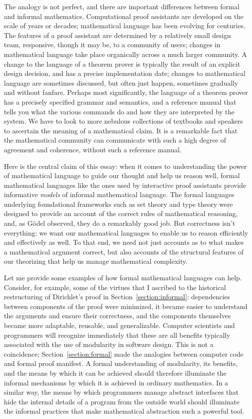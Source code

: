 \documentclass[11pt]{article}
\begin{document}
The analogy is not perfect, and there are important differences between formal and informal mathematics. Computational proof assistants are developed on the scale of years or decades; mathematical language has been evolving for centuries. The features of a proof assistant are determined by a relatively small design team, responsive, though it may be, to a community of users; changes in mathematical language take place organically across a much larger community. A change to the language of a theorem prover is typically the result of an explicit design decision, and has a precise implementation date; changes to mathematical language are sometimes discussed, but often just happen, sometimes gradually and without fanfare. Perhaps most significantly, the language of a theorem prover has a precisely specified grammar and semantics, and a reference manual that tells you what the various commands do and how they are interpreted by the system. We have to look to more nebulous collections of textbooks and speakers to ascertain the meaning of a mathematical claim. It is a remarkable fact that the mathematical community can communicate with such a high degree of agreement and coherence, without such a reference manual.

Here is the central claim of this essay: when it comes to understanding the power of mathematical language to guide our thought and help us reason well, formal mathematical languages like the ones used by interactive proof assistants provide informative \emph{models} of informal mathematical language. The formal languages underlying foundational frameworks such as set theory and type theory were designed to provide an account of the correct rules of mathematical reasoning, and, as G\"odel observed, they do a remarkably good job. But correctness isn't everything: we want our mathematical languages to enable us to reason efficiently and effectively as well. To that end, we need not just accounts as to what makes a mathematical argument correct, but also accounts of the structural features of our theorizing that help us manage mathematical complexity.

Let me provide some examples of how formal mathematical languages can help. Consider, for example, some of the virtues that I ascribed to the historical restructuring of Dirichlet's proof in Section~\ref{section:informal}: dependencies between components of the proof were minimized, it became easier to understand the arguments and ensure their correctness, and the components themselves became more adaptable, reusable, and generalizable. Computer scientists and programmers will recognize immediately that these are all benefits typically associated with the use of modularity in software design. This is not a coincidence; Section~\ref{section:formal} made the analogies between computer code and formal proof manifest. A formal understanding of modularity, its benefits, and the means by which it can be achieved should therefore illuminate the informal mechanisms by which it is achieved in ordinary mathematics. In a similar way, the means by which programmers manage abstract interfaces that hide the internal details of a program from the outside world should illuminate the informal practices that make mathematical abstraction such a powerful tool.
\end{document}
